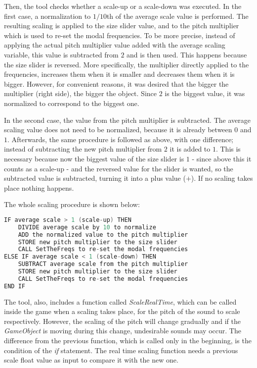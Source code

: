 Then, the tool checks whether a scale-up or a scale-down was executed. In the first case, a normalization to $1/10$th of the average scale value is performed. The resulting scaling is applied to the size slider value, and to the pitch multiplier which is used to re-set the modal frequencies. To be more precise, instead of applying the actual pitch multiplier value added with the average scaling variable, this value is subtracted from $2$ and is then used. This happens because the size slider is reversed. More specifically, the multiplier directly applied to the frequencies, increases them when it is smaller and decreases them when it is bigger. However, for convenient reasons, it was desired that the bigger the multiplier (right side), the bigger the object. Since $2$ is the biggest value, it was normalized to correspond to the biggest one.

In the second case, the value from the pitch multiplier is subtracted. The average scaling value does not need to be normalized, because it is already between $0$ and $1$. Afterwards, the same procedure is followed as above, with one difference; instead of subtracting the new pitch multiplier from $2$ it is added to $1$. This is necessary because now the biggest value of the size slider is $1$ - since above this it counts as a scale-up - and the reversed value for the slider is wanted, so the subtracted value is subtracted, turning it into a plus value ($+$). If no scaling takes place nothing happens.

The whole scaling procedure is shown below:

\begin{lstlisting}[caption={Code for audio adjusting to object scaling},label={lst:scale},language=C]
IF average scale > 1 (scale-up) THEN
    DIVIDE average scale by 10 to normalize
    ADD the normalized value to the pitch multiplier
    STORE new pitch multiplier to the size slider
    CALL SetTheFreqs to re-set the modal frequencies
ELSE IF average scale < 1 (scale-down) THEN
    SUBTRACT average scale from the pitch multiplier
    STORE new pitch multiplier to the size slider
    CALL SetTheFreqs to re-set the modal frequencies
END IF
\end{lstlisting}\label{code:scale}

The tool, also, includes a function called \textit{ScaleRealTime}, which can be called inside the game when a scaling takes place, for the pitch of the sound to scale respectively. However, the scaling of the pitch will change gradually and if the \textit{GameObject} is moving during this change, undesirable sounds may occur. The difference from the previous function, which is called only in the beginning, is the condition of the \textit{if} statement. The real time scaling function needs a previous scale float value as input to compare it with the new one.

